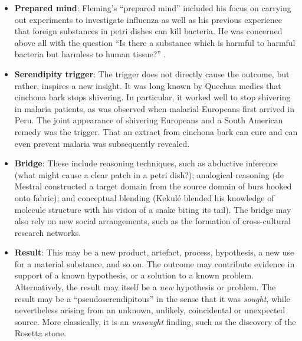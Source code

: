\begin{itemize}
\item \textbf{Prepared mind}: 
Fleming's ``prepared mind'' included his focus
on carrying out experiments to investigate influenza as well as his
previous experience that foreign substances in petri dishes can kill
bacteria.  He was concerned above all with the question ``Is there a
substance which is harmful to harmful bacteria but harmless to human
tissue?''  \cite[p. 161]{roberts}.
%
\item \textbf{Serendipity trigger}: The trigger does not directly
  cause the outcome, but rather, inspires a new insight.  It was long
  known by Quechua medics that cinchona bark stops shivering.  In
  particular, it worked well to stop shivering in malaria patients, as
  was observed when malarial Europeans first arrived in Peru.  The
  joint appearance of shivering Europeans and a South American remedy
  was the trigger.  That an extract from cinchona bark can cure and
  can even prevent malaria was subsequently revealed.
%
\item \textbf{Bridge}: These include reasoning techniques, such as
  abductive inference (what might cause a clear patch in a petri
  dish?); analogical reasoning (de Mestral constructed a target domain
  from the source domain of burs hooked onto fabric); and conceptual
  blending (Kekul\'e blended his knowledge of molecule structure with
  his vision of a snake biting its tail).  The bridge may also rely on
  new social arrangements, such as the formation of cross-cultural
  research networks.
%
\item \textbf{Result}: This may be a new product, artefact, process,
  hypothesis, a new use for a material substance, and so on.  The
  outcome may contribute evidence in support of a known hypothesis, or
  a solution to a known problem.  Alternatively, the result may itself
  be a {\em new} hypothesis or problem.  The result may be a
  ``pseudoserendipitous'' in the sense that it was {\em sought}, while
  nevertheless arising from an unknown, unlikely, coincidental or
  unexpected source.  More classically, it is an \emph{unsought}
  finding, such as the discovery of the Rosetta stone.
%
\end{itemize}

